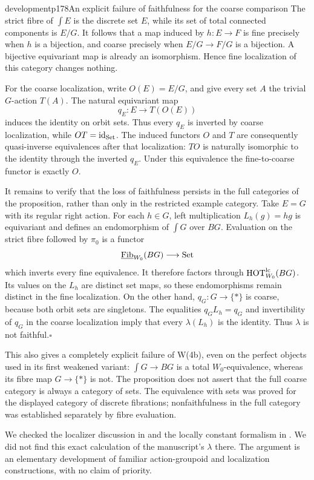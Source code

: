 \begin{dcomment}{development}{p178}{An explicit failure of faithfulness for the coarse comparison}
The strict fibre of $\int E$ is the discrete set $E$, while its set of total connected components is $E/G$. It follows that a map induced by $h:E\to F$ is fine precisely when $h$ is a bijection, and coarse precisely when $E/G\to F/G$ is a bijection. A bijective equivariant map is already an isomorphism. Hence fine localization of this category changes nothing.

For the coarse localization, write $O(E)=E/G$, and give every set $A$ the trivial $G$-action $T(A)$. The natural equivariant map
\[
 q_E:E\longrightarrow T(O(E))
\]
induces the identity on orbit sets. Thus every $q_E$ is inverted by coarse localization, while $OT=\mathrm{id}_{\mathrm{Set}}$. The induced functors $O$ and $T$ are consequently quasi-inverse equivalences after that localization: $TO$ is naturally isomorphic to the identity through the inverted $q_E$. Under this equivalence the fine-to-coarse functor is exactly $O$.

It remains to verify that the loss of faithfulness persists in the full categories of the proposition, rather than only in the restricted example category. Take $E=G$ with its regular right action. For each $h\in G$, left multiplication $L_h(g)=hg$ is equivariant and defines an endomorphism of $\int G$ over $BG$. Evaluation on the strict fibre followed by $\pi_0$ is a functor
\[
 \underline{\mathrm{Fib}}_{W_0}(BG)\longrightarrow\mathrm{Set}
\]
which inverts every fine equivalence. It therefore factors through $\mathrm{HOT}_{W_0}^{\mathrm{lc}}(BG)$. Its values on the $L_h$ are distinct set maps, so these endomorphisms remain distinct in the fine localization. On the other hand, $q_G:G\to\{*\}$ is coarse, because both orbit sets are singletons. The equalities $q_GL_h=q_G$ and invertibility of $q_G$ in the coarse localization imply that every $\lambda(L_h)$ is the identity. Thus $\lambda$ is not faithful.\hfill$\square$

This also gives a completely explicit failure of W(4b), even on the perfect objects used in its first weakened variant: $\int G\to BG$ is a total $W_0$-equivalence, whereas its fibre map $G\to\{*\}$ is not. The proposition does not assert that the full coarse category is always a category of sets. The equivalence with sets was proved for the displayed category of discrete fibrations; nonfaithfulness in the full category was established separately by fibre evaluation.

We checked the localizer discussion in \citep{Cisinski2004Minimal} and the locally constant formalism in \citep{Cisinski2009LocallyConstant}. We did not find this exact calculation of the manuscript's $\lambda$ there. The argument is an elementary development of familiar action-groupoid and localization constructions, with no claim of priority.
\end{dcomment}


